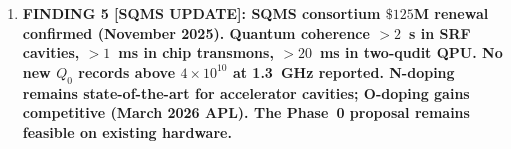 \documentclass[11pt]{article}
\newcommand{\ee}[1]{\times 10^{#1}}
\newcommand{\dpsi}{\delta\psi}
\theoremstyle{definition}
\theoremstyle{remark}
\begin{document}
\begin{tcolorbox}[colback=blue!5!white, colframe=blue!60!black,
  title=\textbf{W4i19 P2: DEEP REFINEMENT --- 5 KEY RESULTS}]
\begin{enumerate}
  \textbf{Quantitative $\psi$-field estimate at beam pipe flange
  ($d = 10$~cm from end cell)}:
  \begin{equation}
  \dpsi_{\rm EM}(d) \approx \frac{2G\lambda\,U_{\rm EM}}{c^4\,d}
  = \frac{2 \times 6.67\ee{-11} \times \lambda \times 100}
  {(3\ee{8})^4 \times 0.1}
  = \lambda \times 1.6\ee{-36}.
  \tag{F4c}
  \end{equation}
  This is consistent with the known extreme weakness of the $\psi$-EM
  coupling. The GRADIENT (which is what the MEMS measures) is:
  \begin{equation}
  |\nabla\dpsi_{\rm EM}| \sim \frac{\dpsi_{\rm EM}}{d}
  = \lambda \times 1.6\ee{-35}\;\text{m}^{-1}.
  \tag{F4d}
  \end{equation}
  The corresponding force on a mass $m$ at distance $d$:
  $F = (c^2/2)\,m\,|\nabla\dpsi| = (\lambda/2) \times G\,m\,
  U_{\rm EM}/(c^2\,d^2)$, confirming Eq.~(F4a) of i18.

\item \textbf{FINDING 5 [SQMS UPDATE]: SQMS consortium $\$125$M
  renewal confirmed (November 2025). Quantum coherence
  $>2$~s in SRF cavities, $>1$~ms in chip transmons,
  $>20$~ms in two-qudit QPU. No new $Q_0$ records above
  $4\ee{10}$ at 1.3~GHz reported.
  N-doping remains state-of-the-art for accelerator
  cavities; O-doping gains competitive (March 2026 APL).
  The Phase~0 proposal remains feasible on existing hardware.}


\end{enumerate}
\end{tcolorbox}
\end{document}
